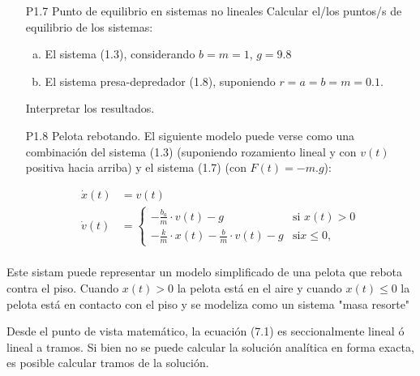 \documentclass{article}
\begin{document}
\begin{itemize}
   \item[P1.7] Punto de equilibrio en sistemas no lineales Calcular el/los puntos/s de equilibrio de los sistemas:
        \begin{enumerate}[a)]
        \item El sistema (1.3), considerando $b=m=1$, $g=9.8$
        \item El sistema presa-depredador (1.8), suponiendo $r=a=b=m=0.1$. 
        \end{enumerate}

Interpretar los resultados.




   \item[P1.8] Pelota rebotando. El siguiente modelo puede verse como una combinación del sistema (1.3) (suponiendo rozamiento lineal y con $v(t)$ positiva hacia arriba) y el sistema (1.7) (con $F(t)=-m.g$):

\begin{align*}
  \dot{x}(t) &= v(t) \\
 \label{P1.8a} \tag{P1.8a}
  \dot{v}(t) &=   \begin{cases}
    -\frac{b_{a}}{m} \cdot v(t) - g & \text{si } x(t) > 0\\
    -\frac{k}{m} \cdot x(t) - \frac{b}{m} \cdot v(t) - g & \text {si} x \leq 0,
  \end{cases}\\
\end{align*}
\end{itemize}

Este sistam puede representar un modelo simplificado de una pelota que rebota contra el piso. Cuando $x(t) > 0$ la pelota está en el aire y cuando $x(t) \leq 0$ la pelota está en contacto con el piso y se modeliza como un sistema "masa resorte"

Desde el punto de vista matemático, la ecuación (7.1) es seccionalmente lineal ó lineal a tramos. Si bien no se puede calcular la solución analítica en forma exacta, es posible calcular tramos de la solución.
\end{document}
